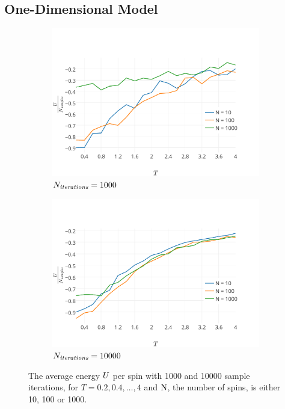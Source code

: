 
\subsection{One-Dimensional Model}

	\begin{figure}
		\centering
		\begin{subfigure}{\columnwidth}
			\centering
			\includegraphics[width=\textwidth, keepaspectratio=true]{img/1D/1DaverageEnergyN1000.pdf}
			\caption{$N_\textit{iterations} = 1000$}
			\label{fig:results:1D:U:1000}
		\end{subfigure}
		\begin{subfigure}{\columnwidth}
			\centering
			\includegraphics[width=\textwidth, keepaspectratio=true]{img/1D/1DaverageEnergyN10000.pdf}
			\caption{$N_\textit{iterations} = 10000$}
			\label{fig:results:1D:U:10000}
		\end{subfigure}	
		\caption{The average energy $U$ per spin with  1000 and  10000 sample iterations, for $T = 0.2, 0.4, \dotsc, 4$ and $\mathrm{N}$, the number of spins, is either 10, 100 or 1000.}
		\label{fig:results:1D:U}
	\end{figure}


